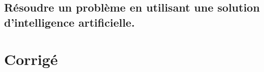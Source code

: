 \documentclass[10pt,fleqn]{article}
\newcommand{\repRel}{../..}
\newcommand{\repStyle}{\repRel/Style}
\newcommand{\td}{fichier_td}
\newcommand{\repExos}{\repRel/ExercicesCompetences}
\newcommand{\repExo}{dossier}
\begin{document}
\subsection{Résoudre un problème en utilisant une solution d'intelligence artificielle. } 

\begin{multicols}{2} 

\end{multicols}

\proftrue
\setcounter{numexo}{0}

\section{Corrigé} 

\renewcommand{\repExo}{\repExos/C1_ProposerDemarche/C1_02_ProposerDemarcheReglageCorrecteur/50_BancBalafre}
\renewcommand{\td}{50_BancBalafre}
\graphicspath{{\repStyle/png/}{\repExo/images/}}


\renewcommand{\repExo}{\repExos/C1_ProposerDemarche/C1_05_ProposerDemarcheActionMecaLoiMvt_PFD/01_T}
\renewcommand{\td}{01_T}
\graphicspath{{\repStyle/png/}{\repExo/images/}}


\renewcommand{\repExo}{\repExos/C1_ProposerDemarche/C1_05_ProposerDemarcheActionMecaLoiMvt_PFD/02_R}
\renewcommand{\td}{02_R}
\graphicspath{{\repStyle/png/}{\repExo/images/}}


\renewcommand{\repExo}{\repExos/C1_ProposerDemarche/C1_05_ProposerDemarcheActionMecaLoiMvt_PFD/03_TT}
\renewcommand{\td}{03_TT}
\graphicspath{{\repStyle/png/}{\repExo/images/}}


\renewcommand{\repExo}{\repExos/C1_ProposerDemarche/C1_05_ProposerDemarcheActionMecaLoiMvt_PFD/04_RR}
\renewcommand{\td}{04_RR}
\graphicspath{{\repStyle/png/}{\repExo/images/}}


\renewcommand{\repExo}{\repExos/C1_ProposerDemarche/C1_05_ProposerDemarcheActionMecaLoiMvt_PFD/05_RT}
\renewcommand{\td}{05_RT}
\graphicspath{{\repStyle/png/}{\repExo/images/}}


\renewcommand{\repExo}{\repExos/C1_ProposerDemarche/C1_05_ProposerDemarcheActionMecaLoiMvt_PFD/06_TR}
\renewcommand{\td}{06_TR}
\graphicspath{{\repStyle/png/}{\repExo/images/}}


\renewcommand{\repExo}{\repExos/C1_ProposerDemarche/C1_05_ProposerDemarcheActionMecaLoiMvt_PFD/07_RR3D}
\renewcommand{\td}{07_RR3D}
\graphicspath{{\repStyle/png/}{\repExo/images/}}

\end{document}
